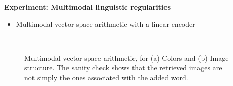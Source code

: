 \documentclass[serif,mathserif,final]{beamer}
\begin{document}
\begin{frame}{}
\begin{columns}[t]
\begin{column}{0.32\linewidth}
\begin{block}{\bf{\large Experiment: Multimodal linguistic regularities}}  
  \begin{itemize}
  \item Multimodal vector space arithmetic with a linear encoder
  \end{itemize}
  \begin{figure}
    \centering
    \mbox{
      \hspace{0.1in}
    }
    \caption{Multimodal vector space arithmetic, for (a) Colors and (b) Image
      structure. The sanity check shows that the retrieved images are not 
      simply the ones associated with the added word.} 
    \label{fig:lr}
  \end{figure}
\end{block}
\vfill
\endminipage
\end{column}%

\begin{column}{0.32\linewidth}
\minipage[c][0.9\textheight][s]{\columnwidth}
\vfill


\end{column}
\end{columns}
\end{frame}
\end{document}
